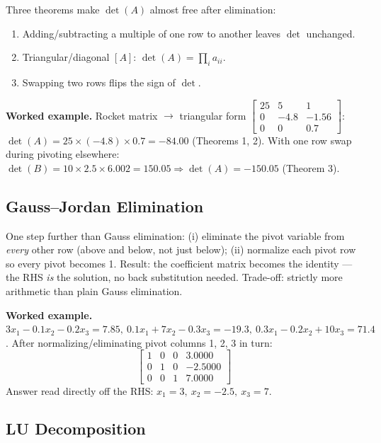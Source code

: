 Three theorems make $\det(A)$ almost free after elimination:
\begin{enumerate}
\item Adding/subtracting a multiple of one row to another leaves $\det$ unchanged.
\item Triangular/diagonal $[A]$: $\det(A)=\prod_i a_{ii}$.
\item Swapping two rows flips the sign of $\det$.
\end{enumerate}

\begin{examplebox}
\textbf{Worked example.} Rocket matrix $\to$ triangular form $\begin{bmatrix}25&5&1\\0&-4.8&-1.56\\0&0&0.7\end{bmatrix}$: $\det(A)=25\times(-4.8)\times0.7=-84.00$ (Theorems 1, 2). With one row swap during pivoting elsewhere: $\det(B)=10\times2.5\times6.002=150.05\Rightarrow\det(A)=-150.05$ (Theorem 3).
\end{examplebox}

\subsection{Gauss--Jordan Elimination}

\begin{defbox}
One step further than Gauss elimination: (i) eliminate the pivot variable from \emph{every} other row (above and below, not just below); (ii) normalize each pivot row so every pivot becomes 1. Result: the coefficient matrix becomes the identity — the RHS \emph{is} the solution, no back substitution needed. Trade-off: strictly more arithmetic than plain Gauss elimination.
\end{defbox}

\begin{examplebox}
\textbf{Worked example.} $3x_1{-}0.1x_2{-}0.2x_3=7.85,\ 0.1x_1{+}7x_2{-}0.3x_3={-}19.3,\ 0.3x_1{-}0.2x_2{+}10x_3=71.4$. After normalizing/eliminating pivot columns 1, 2, 3 in turn:
\[
\begin{bmatrix}1&0&0&3.0000\\0&1&0&-2.5000\\0&0&1&7.0000\end{bmatrix}
\]
Answer read directly off the RHS: $x_1=3,\ x_2=-2.5,\ x_3=7$.
\end{examplebox}

\subsection{LU Decomposition}

